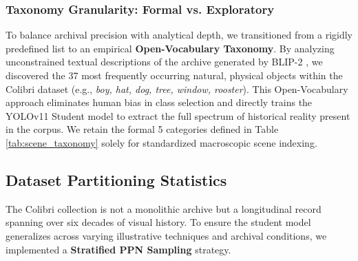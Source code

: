\documentclass[12pt,onecolumn,a4paper]{IEEEtran}
\begin{document}
\begin{table}[!htbp]
\centering
\caption{Historical Scene Classification Categories and Rationale.}
\label{tab:scene_taxonomy}
\end{table}
\subsubsection{Taxonomy Granularity: Formal vs. Exploratory}
To balance archival precision with analytical depth, we transitioned from a rigidly predefined list to an empirical \textbf{Open-Vocabulary Taxonomy}. By analyzing unconstrained textual descriptions of the archive generated by BLIP-2 \cite{blip2_2023}, we discovered the 37 most frequently occurring natural, physical objects within the Colibri dataset (e.g., \textit{boy, hat, dog, tree, window, rooster}). This Open-Vocabulary approach eliminates human bias in class selection and directly trains the YOLOv11 Student model to extract the full spectrum of historical reality present in the corpus. We retain the formal 5 categories defined in Table \ref{tab:scene_taxonomy} solely for standardized macroscopic scene indexing.

\subsection{Dataset Partitioning Statistics}
The Colibri collection is not a monolithic archive but a longitudinal record spanning over six decades of visual history. To ensure the student model generalizes across varying illustrative techniques and archival conditions, we implemented a \textbf{Stratified PPN Sampling} strategy.
\end{document}
